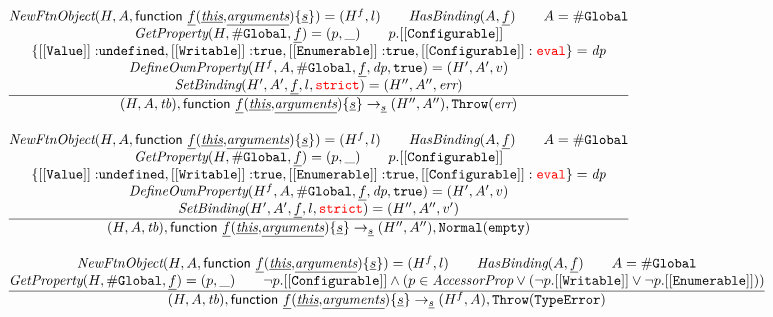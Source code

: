 \[\begin{array}{l@{~~}l@{~~}ll}
\frac{\begin{matrix}
\hf{NewFtnObject}(H,A,\irfndecl) = (H^f, l)
\rulesep
\hf{HasBinding}(A, \ir{f})
\rulesep A = \lg\\
\hf{GetProperty}(H,\lg,\ir{f}) = (p, \_)
\rulesep
p.{\tt[[Configurable]]}
\\
\{{\tt [[Value]]:}\undef, {\tt [[Writable]]:}\true, {\tt [[Enumerable]]:}\true, {\tt [[Configurable]]:\eval}\} = \emph{dp}
\\
\hf{DefineOwnProperty}(H^f,A,\lg,\ir{f}, \emph{dp}, \true) = (H',A',v)\\
\hf{SetBinding}(H', A', \ir{f}, l, \strict) = (H'', A'', \err)
\end{matrix}}{\begin{matrix}
\state, \irfndecl \rightarrow_{\ir\stmt} \respp,\error
\end{matrix}}\\[2em]

\frac{\begin{matrix}
\hf{NewFtnObject}(H,A,\irfndecl) = (H^f, l)
\rulesep
\hf{HasBinding}(A, \ir{f})
\rulesep A = \lg\\
\hf{GetProperty}(H,\lg,\ir{f}) = (p, \_)
\rulesep
p.{\tt[[Configurable]]}
\\
\{{\tt [[Value]]:}\undef, {\tt [[Writable]]:}\true, {\tt [[Enumerable]]:}\true, {\tt [[Configurable]]:\eval}\} = \emph{dp}
\\
\hf{DefineOwnProperty}(H^f,A,\lg,\ir{f}, \emph{dp}, \true) = (H',A',v)\\
\hf{SetBinding}(H', A', \ir{f}, l, \strict) = (H'', A'', v')
\end{matrix}}{\begin{matrix}
\state, \irfndecl \rightarrow_{\ir\stmt} \respp,\void
\end{matrix}}\\[2em]


\frac{\begin{matrix}
\hf{NewFtnObject}(H,A,\irfndecl) = (H^f, l)
\rulesep
\hf{HasBinding}(A, \ir{f})
\rulesep A = \lg\\
\hf{GetProperty}(H,\lg,\ir{f}) = (p, \_)
\rulesep
\neg p.{\tt[[Configurable]]}
\wedge (p \in \emph{AccessorProp} \vee (\neg p.{\tt[[Writable]]} \vee \neg p.{\tt[[Enumerable]]}))
\end{matrix}}{\begin{matrix}
\state, \irfndecl \rightarrow_{\ir\stmt} (H^f,A), {\tt Throw}(\te)
\end{matrix}}\\[2em]


\end{array}\]
